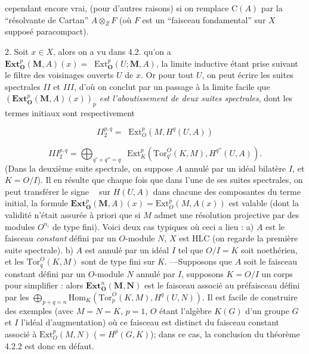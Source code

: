 \clearpage
{}

cependant encore vrai, (pour d'autres raisons) si on remplace $\mathrm C(A)$ par la
``résolvante de Cartan'' $A\otimes_ZF$ (où $F$ est un ``faisceau
fondamental'' sur $X$ supposé paracompact).

2. Soit $x\in X$, alors on a vu dans 4.2. qu'on a
$\mathbf{Ext}_{\mathbf O}^p(\mathbf M,A)(x)=
\mathop{\underset{\to}{\mathrm{lim.}}}\mathrm{Ext}_{\mathbf O}^p(U;\mathbf M,A)$, la limite inductive étant
prise suivant le filtre des voisinages ouverts $U$ de $x$.
Or pour tout $U$, on peut écrire les suites spectrales $II$ et $III$, d'où on
conclut par un passage à la limite facile que
$(\mathbf{Ext}_{\mathbf O}^p(\mathbf M,A)(x))_p$ \textit{est l'aboutissement de deux
suites spectrales}, dont les termes initiaux sont respectivement

\[
II_2^{p,q}=\mathop{\underset{\to}{\mathrm{lim.}}}
\mathrm{Ext}_O^p(M,H^q(U,A))
\]

\[
III_2^{p,q}=
\bigoplus_{q'+q''=q}\mathop{\underset{\to}{\mathrm{lim.}}}
\mathrm{Ext}_K^p(\mathrm{Tor}_{q'}^O(K,M),H^{q''}(U,A)).
\]
(Dans la deuxième suite spectrale, on suppose $A$ annulé par un idéal bilatère
$I$, et $K=O/I$).
Il en résulte que chaque fois que dans l'une de ses suites spectrales, on peut
transférer le signe $\mathop{\underset{\to}{\mathrm{lim.}}}$ sur $H(U,A)$ dans chacune des composantes du
terme initial, la formule
$\mathbf{Ext}_{\mathbf O}^p(\mathbf M,A)(x)=
\mathrm{Ext}_O^p(M,A(x))$ est valable (dont la validité n'était assurée à
priori que si $M$ admet une résolution projective par des modules $O^{n_i}$ de
type fini). Voici deux cas typiques où ceci a lieu :
a) $A$ est le faisceau \textit{constant} défini par un $O$-module $N$, $X$ est
HLC (on regarde la première suite spectrale).
b) $A$ est annulé par un idéal $I$ tel que $O/I=K$ soit noethérien, et les
$\mathrm{Tor}_q^O(K,M)$ sont de type fini sur $K$. ---Supposons que $A$ soit
le faisceau constant défini par un $O$-module $N$ annulé par $I$, supposons
$K=O/I$ un corps pour simplifier : alors
$\mathbf{Ext}_{\mathbf O}^n(\mathbf M,\mathbf N)$ est le faisceau associé au
préfaisceau défini par les
$\displaystyle \bigoplus_{p+q=n}
\mathrm{Hom}_K(\mathrm{Tor}_p^O(K,M),H^q(U,N)).$
Il est facile de construire des exemples (avec $M=N=K$, $p=1$, $O$ étant
l'algèbre $K(G)$ d'un groupe $G$ et $I$ l'idéal d'augmentation) où ce faisceau
est distinct du faisceau constant associé à
$\mathrm{Ext}_O^p(M,N)$ ($=H^p(G,K)$); dans ce cas, la conclusion du théorème
4.2.2 est donc en défaut.

